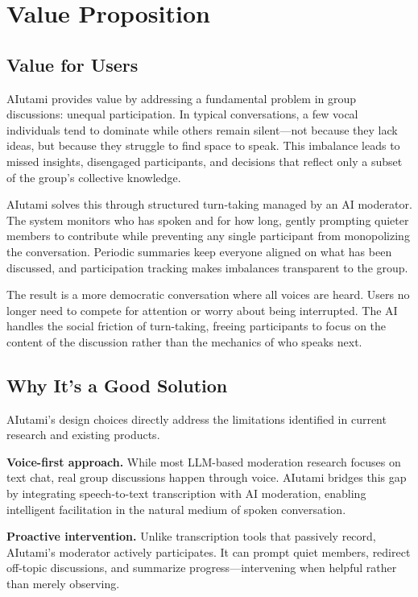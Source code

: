 \chapter{Value Proposition}

\section{Value for Users}

AIutami provides value by addressing a fundamental problem in group discussions: unequal participation. In typical conversations, a few vocal individuals tend to dominate while others remain silent---not because they lack ideas, but because they struggle to find space to speak. This imbalance leads to missed insights, disengaged participants, and decisions that reflect only a subset of the group's collective knowledge.

AIutami solves this through structured turn-taking managed by an AI moderator. The system monitors who has spoken and for how long, gently prompting quieter members to contribute while preventing any single participant from monopolizing the conversation. Periodic summaries keep everyone aligned on what has been discussed, and participation tracking makes imbalances transparent to the group.

The result is a more democratic conversation where all voices are heard. Users no longer need to compete for attention or worry about being interrupted. The AI handles the social friction of turn-taking, freeing participants to focus on the content of the discussion rather than the mechanics of who speaks next.


\section{Why It's a Good Solution}

AIutami's design choices directly address the limitations identified in current research and existing products.

\textbf{Voice-first approach.} While most LLM-based moderation research focuses on text chat, real group discussions happen through voice. AIutami bridges this gap by integrating speech-to-text transcription with AI moderation, enabling intelligent facilitation in the natural medium of spoken conversation.

\textbf{Proactive intervention.} Unlike transcription tools that passively record, AIutami's moderator actively participates. It can prompt quiet members, redirect off-topic discussions, and summarize progress---intervening when helpful rather than merely observing.

